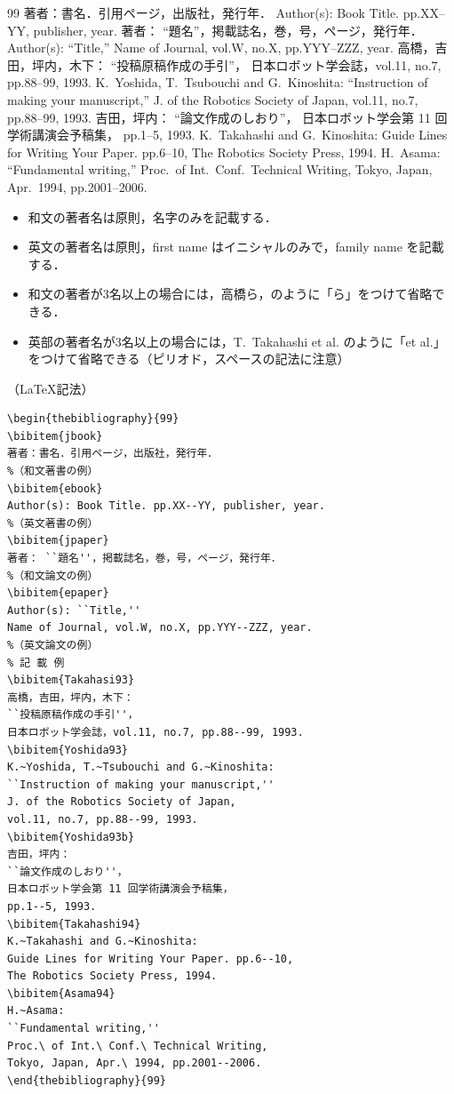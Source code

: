 \documentclass[a4paper,11pt,dvipdfmx]{jlreq}
\begin{document}
\begin{thebibliography}{99}
著者：書名．引用ページ，出版社，発行年．
Author(s): Book Title. pp.XX--YY, publisher, year.
著者： ``題名''，掲載誌名，巻，号，ページ，発行年．
Author(s): ``Title,''
Name of Journal, vol.W, no.X, pp.YYY--ZZZ, year.
高橋，吉田，坪内，木下：
``投稿原稿作成の手引''，
日本ロボット学会誌，vol.11, no.7, pp.88--99, 1993.
K.~Yoshida, T.~Tsubouchi and G.~Kinoshita:
``Instruction of making your manuscript,''
J. of the Robotics Society of Japan,
vol.11, no.7, pp.88--99, 1993.
吉田，坪内：
``論文作成のしおり''，
日本ロボット学会第 11 回学術講演会予稿集，
pp.1--5, 1993.
K.~Takahashi and G.~Kinoshita:
Guide Lines for Writing Your Paper. pp.6--10,
The Robotics Society Press, 1994.
H.~Asama:
``Fundamental writing,''
Proc.\ of Int.\ Conf.\ Technical Writing,
Tokyo, Japan, Apr.\ 1994, pp.2001--2006.
\end{thebibliography}

\begin{itemize}
\item 和文の著者名は原則，名字のみを記載する．
\item 英文の著者名は原則，first name はイニシャルのみで，family name を記載する．
\item 和文の著者が3名以上の場合には，高橋ら，のように「ら」をつけて省略できる．
\item 英部の著者名が3名以上の場合には，T.~Takahashi et al. のように「et al.」をつけて省略できる（ピリオド，スペースの記法に注意）
\end{itemize}

（\LaTeX 記法）
\begin{verbatim}
\begin{thebibliography}{99}
\bibitem{jbook}
著者：書名．引用ページ，出版社，発行年．
%（和文著書の例）
\bibitem{ebook}
Author(s): Book Title. pp.XX--YY, publisher, year.
%（英文著書の例）
\bibitem{jpaper}
著者： ``題名''，掲載誌名，巻，号，ページ，発行年．
%（和文論文の例）
\bibitem{epaper}
Author(s): ``Title,''
Name of Journal, vol.W, no.X, pp.YYY--ZZZ, year.
%（英文論文の例）
% 記 載 例
\bibitem{Takahasi93}
高橋，吉田，坪内，木下：
``投稿原稿作成の手引''，
日本ロボット学会誌，vol.11, no.7, pp.88--99, 1993.
\bibitem{Yoshida93}
K.~Yoshida, T.~Tsubouchi and G.~Kinoshita:
``Instruction of making your manuscript,''
J. of the Robotics Society of Japan,
vol.11, no.7, pp.88--99, 1993.
\bibitem{Yoshida93b}
吉田，坪内：
``論文作成のしおり''，
日本ロボット学会第 11 回学術講演会予稿集，
pp.1--5, 1993.
\bibitem{Takahashi94}
K.~Takahashi and G.~Kinoshita:
Guide Lines for Writing Your Paper. pp.6--10,
The Robotics Society Press, 1994.
\bibitem{Asama94}
H.~Asama:
``Fundamental writing,''
Proc.\ of Int.\ Conf.\ Technical Writing,
Tokyo, Japan, Apr.\ 1994, pp.2001--2006.
\end{thebibliography}{99}
\end{verbatim}
\end{document}
